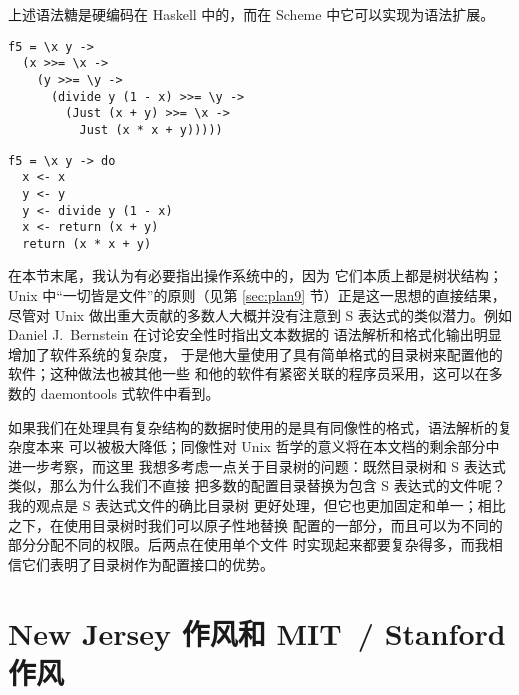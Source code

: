 上述语法糖是硬编码在 Haskell 中的，而在 Scheme 中它可以实现为语法扩展。
\pagebreak
\colskipa\begin{multicols}{2}
\begin{wquoting}
\begin{Verbatim}
f5 = \x y ->
  (x >>= \x ->
    (y >>= \y ->
      (divide y (1 - x) >>= \y ->
        (Just (x + y) >>= \x ->
          Just (x * x + y)))))
\end{Verbatim}
\end{wquoting}
\begin{wquoting}
\begin{Verbatim}
f5 = \x y -> do
  x <- x
  y <- y
  y <- divide y (1 - x)
  x <- return (x + y)
  return (x * x + y)
\end{Verbatim}
\end{wquoting}
\end{multicols}\colskipb

在本节末尾，我认为有必要指出操作系统中的，因为
它们本质上都是树状结构；Unix 中“一切皆是文件”的原则（见第 \ref{sec:plan9}
节）正是这一思想的直接结果，尽管对 Unix 做出重大贡献的多数人大概并没有注意到
S 表达式的类似潜力。例如 Daniel J.\ Bernstein 在讨论安全性时指出文本数据的
语法解析和格式化输出明显增加了软件系统的复杂度，
于是他大量使用了具有简单格式的目录树来配置他的软件；这种做法也被其他一些
和他的软件有紧密关联的程序员采用，这可以在多数的 daemontools 式软件中看到。

如果我们在处理具有复杂结构的数据时使用的是具有同像性的格式，语法解析的复杂度本来
可以被极大降低；同像性对 Unix 哲学的意义将在本文档的剩余部分中进一步考察，而这里
我想多考虑一点关于目录树的问题：既然目录树和 S 表达式类似，那么为什么我们不直接
把多数的配置目录替换为包含 S 表达式的文件呢？我的观点是 S 表达式文件的确比目录树
更好处理，但它也更加固定和单一；相比之下，在使用目录树时我们可以原子性地替换
配置的一部分，而且可以为不同的部分分配不同的权限。后两点在使用单个文件
时实现起来都要复杂得多，而我相信它们表明了目录树作为配置接口的优势。

\section{New Jersey 作风和 MIT~/ Stanford 作风}\label{sec:wib}

